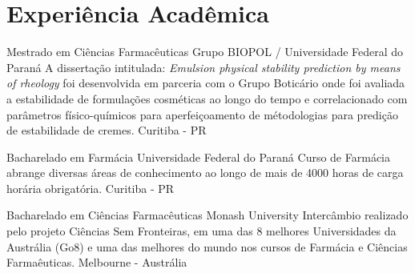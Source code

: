 \section{Experiência Acadêmica}

{Mestrado em Ciências Farmacêuticas}
{Grupo BIOPOL / Universidade Federal do Paraná}
{
    A dissertação intitulada: \emph{Emulsion physical stability prediction by means of rheology}
    foi desenvolvida em parceria com o Grupo Boticário onde foi avaliada a estabilidade
    de formulações cosméticas ao longo do tempo e correlacionado com parâmetros 
    físico-químicos para aperfeiçoamento de métodologias para predição de estabilidade de cremes.
}
{Curitiba - PR}

{Bacharelado em Farmácia}
{Universidade Federal do Paraná}
{
    Curso de Farmácia abrange diversas áreas de conhecimento
    ao longo de mais de 4000 horas de carga horária obrigatória.
}
{Curitiba - PR}

{Bacharelado em Ciências Farmacêuticas}
{Monash University}
{
    Intercâmbio realizado pelo projeto Ciências Sem Fronteiras,
    em uma das 8 melhores Universidades da Austrália (Go8) e uma das melhores
    do mundo nos cursos de Farmácia e Ciências Farmaêuticas.
}
{Melbourne - Austrália}